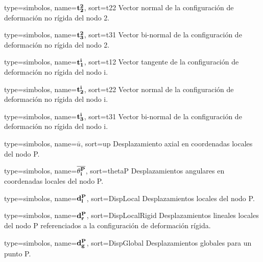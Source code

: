 {
	type={simbolos},
	name={$\bf{t_2^2}$}, %
	sort={t22} %
}
{Vector normal de la configuración de deformación no rígida del nodo 2.}

{
	type={simbolos},
	name={$\bf{t_3^2}$}, %
	sort={t31} %
}
{Vector bi-normal de la configuración de deformación no rígida del nodo 2.}

{
	type={simbolos},
	name={$\bf{t_1^i}$}, %
	sort={t12} %
}
{Vector tangente de la configuración de deformación no rígida del nodo i.}

{
	type={simbolos},
	name={$\bf{t_2^i}$}, %
	sort={t22} %
}
{Vector normal de la configuración de deformación no rígida del nodo i.}

{
	type={simbolos},
	name={$\bf{t_3^i}$}, %
	sort={t31} %
}
{Vector bi-normal de la configuración de deformación no rígida del nodo i.}

{
	type={simbolos},
	name={$\bar{u}$}, %
	sort={up} %
}
{Desplazamiento axial en coordenadas locales del nodo P.}

{
	type={simbolos},
	name={$\bf{\overline{\theta_i^P}}$}, %
	sort={thetaP} %
}
{Desplazamientos angulares en coordenadas locales del nodo P.}

{
	type={simbolos},
	name={$\bf{d}_l^P$}, %
	sort={DispLocal} %
}
{Desplazamientos locales del nodo P.}

{
	type={simbolos},
	name={$\bf{d}_r^P$}, %
	sort={DispLocalRigid} %
}
{Desplazamientos lineales locales del nodo P referenciados a la configuración de deformación rígida.}


{
	type={simbolos},
	name={$\bf{d}_g^P$}, %
	sort={DispGlobal} %
}
{Desplazamientos globales para un punto P.}


